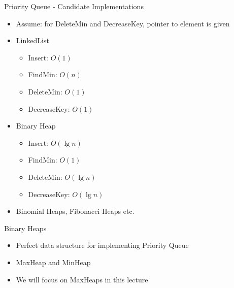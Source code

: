\documentclass{beamer}
\begin{document}
\begin{frame}{Priority Queue - Candidate Implementations}
    \begin{itemize}
        \item Assume: for DeleteMin and DecreaseKey, pointer to element is given
        \item LinkedList
        \begin{itemize}
            \item Insert: \pause $O(1)$
            \item FindMin: \pause $O(n)$
            \item DeleteMin: \pause $O(1)$
            \item DecreaseKey: \pause $O(1)$
        \end{itemize}
        \item Binary Heap 
        \begin{itemize}
            \item Insert: $O(\lg n)$
            \item FindMin: $O(1)$
            \item DeleteMin: $O(\lg n)$
            \item DecreaseKey: $O(\lg n)$
        \end{itemize}
        \item Binomial Heaps, Fibonacci Heaps etc.
    \end{itemize}
\end{frame}

\begin{frame}{Binary Heaps}
    \begin{itemize}
        \item Perfect data structure for implementing Priority Queue
        \item MaxHeap and MinHeap
        \item We will focus on MaxHeaps in this lecture
    \end{itemize}
\end{frame}
\end{document}
